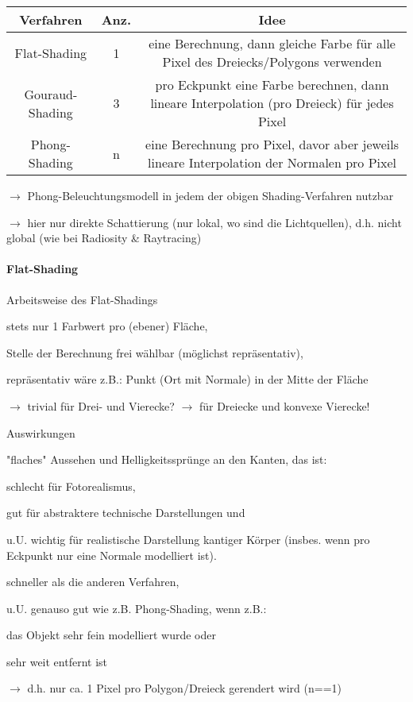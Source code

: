 \documentclass[landscape]{article}
\begin{document}
\begin{multicols}{3}
  \begin{tabular}{c | c | c}
    Verfahren       & Anz. & Idee                                                                                        \\\hline
    Flat-Shading    & 1    & eine Berechnung, dann gleiche Farbe für alle Pixel des Dreiecks/Polygons verwenden          \\
    Gouraud-Shading & 3    & pro Eckpunkt eine Farbe berechnen, dann lineare Interpolation (pro Dreieck) für jedes Pixel \\
    Phong-Shading   & n    & eine Berechnung pro Pixel, davor aber jeweils lineare Interpolation der Normalen pro Pixel  \\
  \end{tabular}
  
  $\rightarrow$ Phong-Beleuchtungsmodell in jedem der obigen Shading-Verfahren nutzbar
  
  $\rightarrow$ hier nur direkte Schattierung (nur lokal, wo sind die Lichtquellen), d.h. nicht global (wie bei Radiosity \& Raytracing)
  
  \paragraph{Flat-Shading}
  Arbeitsweise des Flat-Shadings
  \begin{itemize*}
    \item stets nur 1 Farbwert pro (ebener) Fläche,
    \item Stelle der Berechnung frei wählbar (möglichst repräsentativ),
    \item repräsentativ wäre z.B.: Punkt (Ort mit Normale) in der Mitte der Fläche
    \item $\rightarrow$ trivial für Drei- und Vierecke? $\rightarrow$ für Dreiecke und konvexe Vierecke!
  \end{itemize*}
  
  Auswirkungen
  \begin{itemize*}
    \item "flaches" Aussehen und Helligkeitssprünge an den Kanten, das ist:
    \item schlecht für Fotorealismus,
    \item gut für abstraktere technische Darstellungen und
    \item u.U. wichtig für realistische Darstellung kantiger Körper (insbes. wenn pro Eckpunkt nur eine Normale modelliert ist).
    \item schneller als die anderen Verfahren,
    \item u.U. genauso gut wie z.B. Phong-Shading, wenn z.B.:
    \item das Objekt sehr fein modelliert wurde oder
    \item sehr weit entfernt ist
    \item $\rightarrow$ d.h. nur ca. 1 Pixel pro Polygon/Dreieck gerendert wird (n==1)
  \end{itemize*}
  

\end{multicols}
\end{document}
